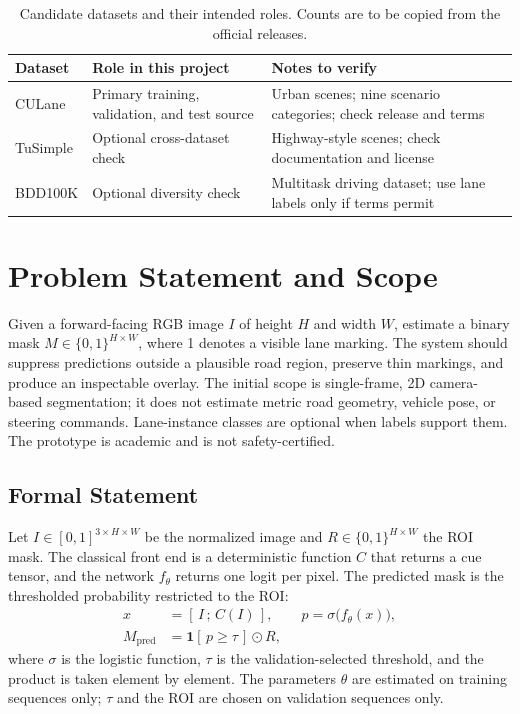 \documentclass[10pt,a4paper,twocolumn]{article}
\begin{document}
\begin{table}[H]
\centering
\caption{Candidate datasets and their intended roles. Counts are to be copied from the official releases.}
\footnotesize
\begin{tabularx}{\columnwidth}{|l|X|X|}
\hline
\rowcolor{gray!18}\textbf{Dataset}&\textbf{Role in this project}&\textbf{Notes to verify}\\ \hline
CULane & Primary training, validation, and test source & Urban scenes; nine scenario categories; check release and terms\\ \hline
TuSimple & Optional cross-dataset check & Highway-style scenes; check documentation and license\\ \hline
BDD100K & Optional diversity check & Multitask driving dataset; use lane labels only if terms permit\\ \hline
\end{tabularx}
\end{table}

\section{Problem Statement and Scope}\label{sec:problem}
Given a forward-facing RGB image $I$ of height $H$ and width $W$, estimate a binary mask $M\in\{0,1\}^{H\times W}$, where 1 denotes a visible lane marking. The system should suppress predictions outside a plausible road region, preserve thin markings, and produce an inspectable overlay. The initial scope is single-frame, 2D camera-based segmentation; it does not estimate metric road geometry, vehicle pose, or steering commands. Lane-instance classes are optional when labels support them. The prototype is academic and is not safety-certified.

\subsection{Formal Statement}
Let $I\in[0,1]^{3\times H\times W}$ be the normalized image and $R\in\{0,1\}^{H\times W}$ the ROI mask. The classical front end is a deterministic function $C$ that returns a cue tensor, and the network $f_\theta$ returns one logit per pixel. The predicted mask is the thresholded probability restricted to the ROI:
\begin{align}
x &= [\,I\,;\,C(I)\,], \qquad p = \sigma\big(f_\theta(x)\big), \\
M_{\mathrm{pred}} &= \mathbf{1}[\,p\ge\tau\,]\odot R,
\end{align}
where $\sigma$ is the logistic function, $\tau$ is the validation-selected threshold, and the product is taken element by element. The parameters $\theta$ are estimated on training sequences only; $\tau$ and the ROI are chosen on validation sequences only.
\end{document}
